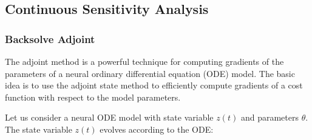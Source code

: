 \begin{table}[t]
  \centering
  \caption{\textbf{Memory Requirements for various Sensitivity Algorithms for ODEs}}
  \label{tab:memory_requirements_sensitivity_analysis_odes}
\end{table}


\subsection{Continuous Sensitivity Analysis}
\label{subsec:continuous_sensitivity_analysis_odes}

\subsubsection{Backsolve Adjoint}
\label{subsubsec:backsolve_adjoint}


The adjoint method is a powerful technique for computing gradients of the parameters of a neural ordinary differential equation (ODE) model. The basic idea is to use the adjoint state method to efficiently compute gradients of a cost function with respect to the model parameters.

Let us consider a neural ODE model with state variable $z(t)$ and parameters $\theta$. The state variable $z(t)$ evolves according to the ODE:

